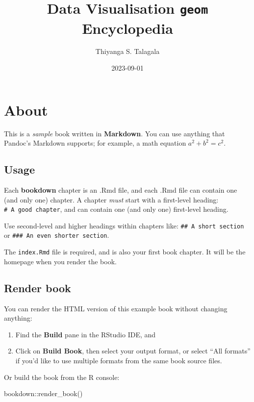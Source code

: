 \documentclass[
]{book}
\title{Data Visualisation \texttt{geom} Encyclopedia}
\author{Thiyanga S. Talagala}
\date{2023-09-01}
\newenvironment{Shaded}{\begin{snugshade}}{\end{snugshade}}
\newcommand{\FunctionTok}[1]{\textcolor[rgb]{0.00,0.00,0.00}{#1}}
\newcommand{\NormalTok}[1]{#1}
\newcommand{\SpecialCharTok}[1]{\textcolor[rgb]{0.00,0.00,0.00}{#1}}
\begin{document}
\maketitle

{
\setcounter{tocdepth}{1}
\tableofcontents
}
\hypertarget{about}{%
\chapter{About}\label{about}}

This is a \emph{sample} book written in \textbf{Markdown}. You can use anything that Pandoc's Markdown supports; for example, a math equation \(a^2 + b^2 = c^2\).

\hypertarget{usage}{%
\section{Usage}\label{usage}}

Each \textbf{bookdown} chapter is an .Rmd file, and each .Rmd file can contain one (and only one) chapter. A chapter \emph{must} start with a first-level heading: \texttt{\#\ A\ good\ chapter}, and can contain one (and only one) first-level heading.

Use second-level and higher headings within chapters like: \texttt{\#\#\ A\ short\ section} or \texttt{\#\#\#\ An\ even\ shorter\ section}.

The \texttt{index.Rmd} file is required, and is also your first book chapter. It will be the homepage when you render the book.

\hypertarget{render-book}{%
\section{Render book}\label{render-book}}

You can render the HTML version of this example book without changing anything:

\begin{enumerate}
\def\labelenumi{\arabic{enumi}.}
\item
  Find the \textbf{Build} pane in the RStudio IDE, and
\item
  Click on \textbf{Build Book}, then select your output format, or select ``All formats'' if you'd like to use multiple formats from the same book source files.
\end{enumerate}

Or build the book from the R console:

\begin{Shaded}
\begin{Highlighting}[]
\NormalTok{bookdown}\SpecialCharTok{::}\FunctionTok{render\_book}\NormalTok{()}
\end{Highlighting}
\end{Shaded}
\end{document}
